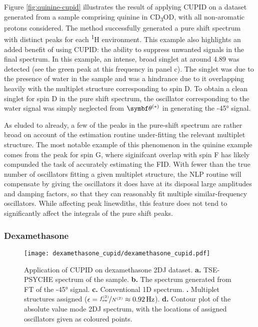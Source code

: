 Figure \ref{fig:quinine-cupid} illustrates the result of applying \ac{CUPID} on
a dataset generated from a sample comprising quinine in CD\textsubscript{3}OD,
with all non-aromatic protons considered. The method successfully generated a
pure shift spectrum with distinct peaks for each \textsuperscript{1}H
environment. This example also highlights an added benefit of using \ac{CUPID}:
the ability to suppress unwanted signals in the final spectrum. In this
example, an intense, broad singlet at around \qty{4.89}{\partspermillion}
was detected (see the green peak at this frequency in panel c).
The singlet was due to the presence of water in the sample and was a hindrance
due to it overlapping heavily with the multiplet structure corresponding to
spin D. To obtain a clean singlet for spin D in the pure shift spectrum, the
oscillator corresponding to the water signal was simply neglected from
$\bthstar$ in generating the \ang{-45} signal. 

As eluded to already, a few of the peaks in the pure-shift spectrum are rather
broad on account of the estimation routine under-fitting the relevant multiplet
structure. The most notable example of this phenomenon in the quinine example
comes from the peak for spin G, where siginifcant overlap with spin F has likely
compunded the task of accurately estimating the \ac{FID}. With fewer than the
true number of oscillators fitting a given multiplet structure, the \ac{NLP}
routine will compensate by giving the oscillators it does have at its disposal
large amplitudes and damping factors, so that they can reasonably fit multiple
similar-frequency oscillators.
While affecting peak linewdiths, this feature does not tend to significantly
affect the integrals of the pure shift peaks. 

\subsubsection{Dexamethasone}

\begin{sidewaysfigure}%
    \centering%
    \texttt{[image: dexamethasone\_cupid/dexamethasone\_cupid.pdf]}%
    \caption[
        Application of \acs{CUPID} on a dexamethasone dataset.
    ]{
        Application of \acs{CUPID} on dexamethasone \ac{2DJ} dataset.
        \textbf{a.} \acs{TSE-PSYCHE} spectrum of the sample.
        \textbf{b.} The spectrum generated from \ac{FT} of the \ang{-45}
        signal.
        \textbf{c.} Conventional \acs{1D} spectrum.
        \textbf{.} Multiplet structures assigned ($\epsilon =
        \nicefrac{f_{\mathrm{sw}}^{(2)}}{N^{(2)}} \approx \qty{0.92}{\hertz}$).
        \textbf{d.} Contour plot of the absolute value mode \acs{2DJ} spectrum,
        with the locations of assigned oscillators given as coloured points.
    }
    \label{fig:dexamethasone-cupid}%
\end{sidewaysfigure}%

